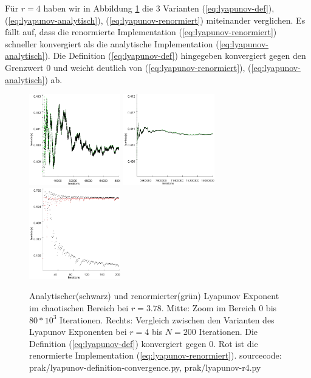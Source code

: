 \documentclass{scrartcl}
\begin{document}
Für $r=4$ haben wir in Abbildung \ref{fig:lyapunov-chaos} die 3 Varianten (\ref{eq:lyapunov-def}), (\ref{eq:lyapunov-analytisch}), (\ref{eq:lyapunov-renormiert}) miteinander verglichen. Es fällt auf, dass die renormierte Implementation (\ref{eq:lyapunov-renormiert}) schneller konvergiert als die analytische Implementation (\ref{eq:lyapunov-analytisch}). 
Die Definition (\ref{eq:lyapunov-def}) hingegeben konvergiert gegen den Grenzwert 0 und weicht deutlich von (\ref{eq:lyapunov-renormiert}), (\ref{eq:lyapunov-analytisch}) ab.
\begin{figure}[!htbp]
\centering
\includegraphics[height=150px]{lya378-zoom}
\includegraphics[height=150px]{lya378}
\includegraphics[height=150px, width=150px]{lyapunov_r4}
\caption{Analytischer(schwarz) und renormierter(grün) Lyapunov Exponent im chaotischen Bereich bei $r=3.78$. Mitte: Zoom im Bereich 0 bis $80*10^3$ Iterationen. Rechts: Vergleich zwischen den Varianten des Lyapunov Exponenten bei $r=4$ bis $N=200$ Iterationen. Die Definition (\ref{eq:lyapunov-def}) konvergiert gegen 0. Rot ist die renormierte Implementation (\ref{eq:lyapunov-renormiert}). sourcecode: prak/lyapunov-definition-convergence.py, prak/lyapunov-r4.py}
\label{fig:lyapunov-chaos}
\end{figure}
\end{document}
